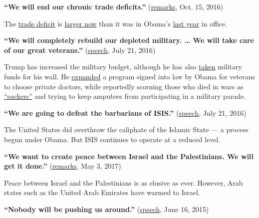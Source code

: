 \textbf{``We will end our chronic trade deficits.''}
(\href{https://www.youtube.com/watch?v=d5Mil0Bys7s}{remarks}, Oct. 15,
2016)

The
\href{https://www.nytimes3xbfgragh.onion/2019/11/05/us/politics/us-trade-deficit.html}{trade
deficit} is
\href{https://www.citizen.org/news/trump-trade-deficit-6-5-higher-than-obamas-last-year-not-eliminated-as-then-candidate-trump-promised/}{larger
now} than it was in Obama's
\href{https://www.bea.gov/news/blog/2020-03-19/us-current-account-deficit-widened-2019}{last
year} in office.

\textbf{``We will completely rebuild our depleted military. \ldots{} We
will take care of our great veterans.''}
(\href{https://www.nytimes3xbfgragh.onion/2016/07/22/us/politics/trump-transcript-rnc-address.html}{speech},
July 21, 2016)

Trump has increased the military budget, although he has also
\href{https://www.washingtonpost.com/immigration/trump-border-wall-funding-illegal/2020/06/26/0d86a42c-b7cf-11ea-9b0f-c797548c1154_story.html}{taken}
military funds for his wall. He
\href{https://apnews.com/d4b73d56f53941788667f367dd4b264b}{expanded} a
program signed into law by Obama for veterans to choose private doctors,
while reportedly scorning those who died in wars as
\href{https://www.theatlantic.com/politics/archive/2020/09/trump-americans-who-died-at-war-are-losers-and-suckers/615997/}{``suckers''}
and trying to keep amputees from participating in a military parade.

\textbf{``We are going to defeat the barbarians of ISIS.''}
(\href{https://www.nytimes3xbfgragh.onion/2016/07/22/us/politics/trump-transcript-rnc-address.html}{speech},
July 21, 2016)

The United States did overthrow the caliphate of the Islamic State --- a
process begun under Obama. But ISIS continues to operate at a reduced
level.

\textbf{``We want to create peace between Israel and the Palestinians.
We will get it done.''}
(\href{https://www.theatlantic.com/international/archive/2017/05/trump-middle-east-peace-is-not-as-difficult-as-people-have-thought/525267/}{remarks},
May 3, 2017)

Peace between Israel and the Palestinians is as elusive as ever.
However, Arab states such as the United Arab Emirates have warmed to
Israel.

\textbf{``Nobody will be pushing us around.''}
(\href{https://www.c-span.org/video/?326473-1/donald-trump-presidential-campaign-announcement}{speech},
June 16, 2015)

